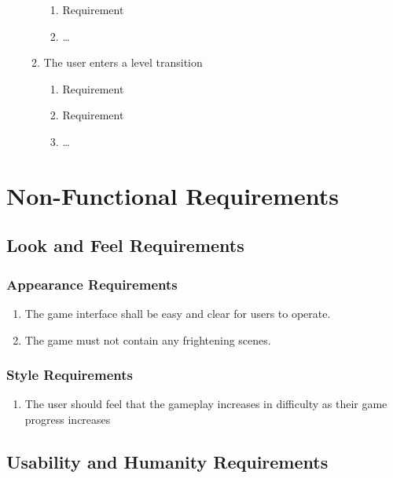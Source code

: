 \documentclass[12pt, titlepage]{article}
\begin{document}
\begin{enumerate}[{VP}1.]
\begin{enumerate}[{BE1}.1]
\begin{enumerate}
      \item Requirement
      \item \dots
    \end{enumerate}
    \item The user enters a level transition
    \begin{enumerate}
      \item Requirement
      \item Requirement
      \item \dots
    \end{enumerate}
  \end{enumerate}
\end{enumerate}

\section{Non-Functional Requirements}
\label{sec:non-functional_requirements}
\subsection{Look and Feel Requirements}
\label{sub:look_and_feel_requirements}

\subsubsection{Appearance Requirements}
\label{ssub:appearance_requirements}
\begin{enumerate}[{LF}1. ]
        \item The game interface shall be easy and clear for users to operate.
        \item The game must not contain any frightening scenes.
\end{enumerate}

\subsubsection{Style Requirements}
\label{ssub:style_requirements}
\begin{enumerate}[{LF}3. ]
        \item The user should feel that the gameplay increases in difficulty as their game progress increases
\end{enumerate}


\subsection{Usability and Humanity Requirements}
\label{sub:usability_and_humanity_requirements}
\end{document}
